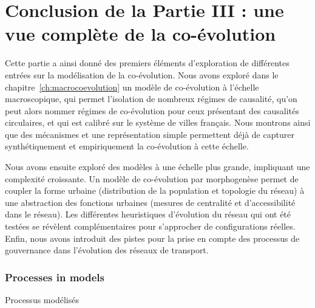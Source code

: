 





\chapter*{Conclusion de la Partie III : une vue complète de la co-évolution}






Cette partie a ainsi donné des premiers éléments d'exploration de différentes entrées sur la modélisation de la co-évolution. Nous avons exploré dans le chapitre~\ref{ch:macrocoevolution} un modèle de co-évolution à l'échelle macroscopique, qui permet l'isolation de nombreux régimes de causalité, qu'on peut alors nommer régimes de co-évolution pour ceux présentant des causalités circulaires, et qui est calibré sur le système de villes français. Nous montrons ainsi que des mécanismes et une représentation simple permettent déjà de capturer synthétiquement et empiriquement la co-évolution à cette échelle.

Nous avons ensuite exploré des modèles à une échelle plus grande, impliquant une complexité croissante. Un modèle de co-évolution par morphogenèse permet de coupler la forme urbaine (distribution de la population et topologie du réseau) à une abstraction des fonctions urbaines (mesures de centralité et d'accessibilité dans le réseau). Les différentes heuristiques d'évolution du réseau qui ont été testées se révèlent complémentaires pour s'approcher de configurations réelles. Enfin, nous avons introduit des pistes pour la prise en compte des processus de gouvernance dans l'évolution des réseaux de transport.




\subsection*{Processes in models}{Processus modélisés}


